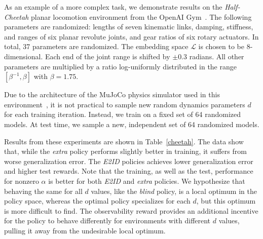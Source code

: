 \documentclass{article}
\newcommand{\cL}{\mathcal{L}}
\newcommand{\blind}{\emph{blind}}
\newcommand{\extra}{\emph{extra}}
\newcommand{\embed}{\emph{E2ID}}
\newcommand{\latent}{\cL}
\newcommand{\idvar}{d}
\begin{document}
As an example of a more complex task, we demonstrate results on the \emph{Half-Cheetah}
planar locomotion environment from the OpenAI Gym~\citep{openai-gym}.
The following parameters are randomized:
lengths of seven kinematic links,
damping, stiffness, and ranges of six planar revolute joints,
and gear ratios of six rotary actuators.
In total, 37 parameters are randomized.
The embedding space $\latent$ is chosen to be 8-dimensional.
Each end of the joint range is shifted by $\pm 0.3$ radians.
All other parameters are multiplied by a ratio log-uniformly distributed in the range $[\beta^{-1}, \beta]$ with $\beta = 1.75$.

Due to the architecture of the MuJoCo physics simulator used in this environment~\citep{todorov-mujoco},
it is not practical to sample new random dynamics parameters $\idvar$ for each training iteration.
Instead, we train on a fixed set of 64 randomized models.
At test time, we sample a new, independent set of 64 randomized models.

Results from these experiments are shown in Table~\ref{cheetah}.
The data show that, while the \extra{} policy performs slightly better in training,
it suffers from worse generalization error.
The \embed{} policies achieves lower generalization error and higher test rewards.
Note that the training, as well as the test, performance for nonzero $\alpha$
is better for both \embed{} and \extra{} policies.
We hypothesize that behaving the same for all $\idvar$ values, like the \blind{} policy,
is a local optimum in the policy space,
whereas the optimal policy specializes for each $\idvar$,
but this optimum is more difficult to find.
The observability reward provides an additional incentive
for the policy to behave differently for environments with different $\idvar$ values,
pulling it away from the undesirable local optimum.
\end{document}
